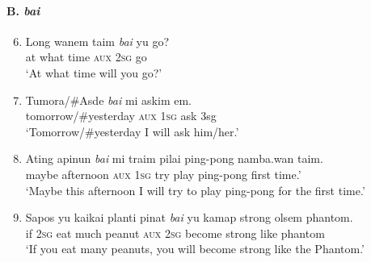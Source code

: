 {\tcbbreak
\paragraph*{B. \textit{bai}}
\begin{enumerate} \setcounter{enumi}{5}
\item  
\gll Long  wanem  taim  \textit{bai}  yu  go?\\
at  what  time  \textsc{aux}  \textsc{2sg}  go\\
\glt ‘At what time will you go?’ 
\item  
\gll Tumora/\#Asde  \textit{bai}  mi  askim  em.\\
tomorrow/\#yesterday  \textsc{aux}  \textsc{1sg}  ask  3sg\\
\glt ‘Tomorrow/\#yesterday I will ask him/her.’
\item  
\gll Ating  apinun  \textit{bai}  mi  traim  pilai  ping-pong  namba.wan  taim.\\
maybe  afternoon  \textsc{aux}  \textsc{1sg}  try  play  ping-pong  first  time.’\\
\glt ‘Maybe this afternoon I will try to play ping-pong for the first time.’  
\item  
\gll   Sapos  yu  kaikai  planti  pinat  \textit{bai}  yu  kamap  strong  olsem  phantom.\\
if  \textsc{2sg}  eat  much  peanut  \textsc{aux}  \textsc{2sg}  become  strong  like  phantom\\
\glt ‘If you eat many peanuts, you will become strong like the Phantom.’ 
\end{enumerate}

}
